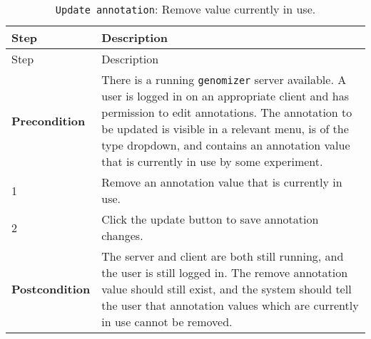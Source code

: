 \begin{longtable}[c]{@{}ll@{}}
\caption{\texttt{Update\ annotation}: Remove value currently in
use.}\tabularnewline
\toprule
\begin{minipage}[b]{0.31\columnwidth}\raggedright\strut
Step
\strut\end{minipage} &
\begin{minipage}[b]{0.63\columnwidth}\raggedright\strut
Description
\strut\end{minipage}\tabularnewline
\midrule
\endfirsthead
\toprule
\begin{minipage}[b]{0.31\columnwidth}\raggedright\strut
Step
\strut\end{minipage} &
\begin{minipage}[b]{0.63\columnwidth}\raggedright\strut
Description
\strut\end{minipage}\tabularnewline
\midrule
\endhead
\begin{minipage}[t]{0.31\columnwidth}\raggedright\strut
\textbf{Precondition}
\strut\end{minipage} &
\begin{minipage}[t]{0.63\columnwidth}\raggedright\strut
There is a running \texttt{genomizer} server available. A user is logged
in on an appropriate client and has permission to edit annotations. The
annotation to be updated is visible in a relevant menu, is of the type
dropdown, and contains an annotation value that is currently in use by
some experiment.
\strut\end{minipage}\tabularnewline
\begin{minipage}[t]{0.31\columnwidth}\raggedright\strut
1
\strut\end{minipage} &
\begin{minipage}[t]{0.63\columnwidth}\raggedright\strut
Remove an annotation value that is currently in use.
\strut\end{minipage}\tabularnewline
\begin{minipage}[t]{0.31\columnwidth}\raggedright\strut
2
\strut\end{minipage} &
\begin{minipage}[t]{0.63\columnwidth}\raggedright\strut
Click the update button to save annotation changes.
\strut\end{minipage}\tabularnewline
\begin{minipage}[t]{0.31\columnwidth}\raggedright\strut
\textbf{Postcondition}
\strut\end{minipage} &
\begin{minipage}[t]{0.63\columnwidth}\raggedright\strut
The server and client are both still running, and the user is still
logged in. The remove annotation value should still exist, and the
system should tell the user that annotation values which are currently
in use cannot be removed.
\strut\end{minipage}\tabularnewline
\bottomrule
\end{longtable}

